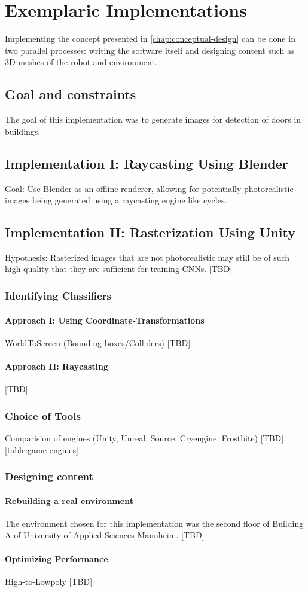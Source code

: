 \chapter{Exemplaric Implementations}
Implementing the concept presented in \autoref{chap:conceptual-design} can be done in two parallel processes: writing the software itself and designing content such as 3D meshes of the robot and environment.

\section{Goal and constraints}
The goal of this implementation was to generate images for detection of doors in buildings. 

\section{Implementation I: Raycasting Using Blender}
Goal: Use Blender as an offline renderer, allowing for potentially photorealistic images being generated using a raycasting engine like cycles.

\section{Implementation II: Rasterization Using Unity}
Hypothesis: Rasterized images that are not photorealistic may still be of such high quality that they are sufficient for training CNNs. [TBD]
\subsection{Identifying Classifiers}
\subsubsection{Approach I: Using Coordinate-Transformations}
WorldToScreen (Bounding boxes/Colliders) [TBD]
\subsubsection{Approach II: Raycasting}
[TBD]


\subsection{Choice of Tools}
Comparision of engines (Unity, Unreal, Source, Cryengine, Frostbite) [TBD] \ref{table:game-engines}

\subsection{Designing content}
\subsubsection{Rebuilding a real environment}
The environment chosen for this implementation was the second floor of Building A of University of Applied Sciences Mannheim. [TBD]
\subsubsection{Optimizing Performance}
High-to-Lowpoly [TBD]